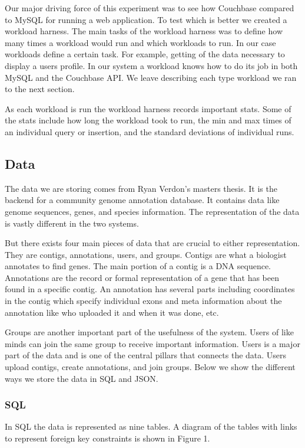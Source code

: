 \documentclass[]{IEEEtran}
\begin{document}
Our major driving force of this experiment was to see how Couchbase compared to MySQL for running a web application. To test which is better we created a workload harness. The main tasks of the workload harness was to define how many times a workload would run and which workloads to run. In our case workloads define a certain task. For example, getting of the data necessary to display a users profile. In our system a workload knows how to do its job in both MySQL and the Couchbase API. We leave describing each type workload we ran to the next section.

As each workload is run the workload harness records important stats. Some of the stats include how long the workload took to run, the min and max times of an individual query or insertion, and the standard deviations of individual runs.

\subsection{Data}
The data we are storing comes from Ryan Verdon's masters thesis. It is the backend for a community genome annotation database. It contains data like genome sequences, genes, and species information. The representation of the data is vastly different in the two systems. 

But there exists four main pieces of data that are crucial to either representation. They are contigs, annotations, users, and groups. Contigs are what a biologist annotates to find genes. The main portion of a contig is a DNA sequence. Annotations are the record or formal representation of a gene that has been found in a specific contig. An annotation has several parts including coordinates in the contig which specify individual exons and meta information about the annotation like who uploaded it and when it was done, etc. 

Groups are another important part of the usefulness of the system. Users of like minds can join the same group to receive important information. Users is a major part of the data and is one of the central pillars that connects the data. Users upload contigs, create annotations, and join groups. Below we show the different ways we store the data in SQL and JSON.

\subsubsection{SQL}
In SQL the data is represented as nine tables. A diagram of the tables with links to represent foreign key constraints is shown in Figure 1. 
\end{document}
